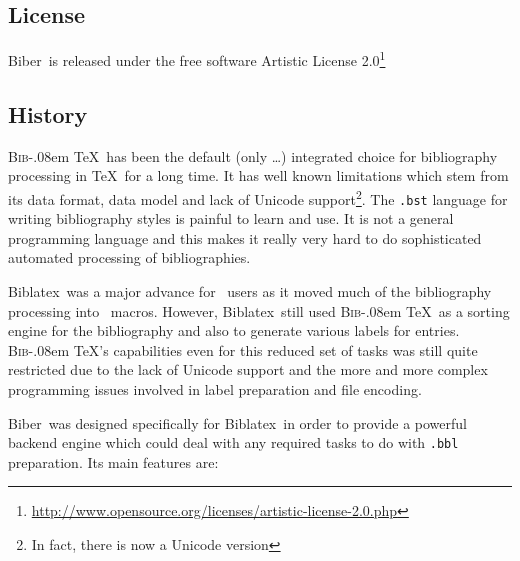\documentclass{ltxdockit}
\def\BibTeX{\textsc{Bib}\kern-.08em \TeX}
\newcommand*{\biber}{Biber\xspace}
\newcommand*{\biblatex}{Biblatex\xspace}
\begin{document}
\subsection{License}

\biber\ is released under the free software Artistic License 2.0\footnote{\url{http://www.opensource.org/licenses/artistic-license-2.0.php}}

\subsection{History}

\BibTeX\ has been the default (only \ldots) integrated choice for
bibliography processing in \TeX\ for a long time. It has well known
limitations which stem from its data format, data model and lack of Unicode
support\footnote{In fact, there is now a Unicode version}. The
\verb+.bst+ language for writing bibliography styles is painful to learn
and use. It is not a general programming language and this makes it really
very hard to do sophisticated automated processing of bibliographies.

\biblatex\ was a major advance for \latex\ users as it moved much
of the bibliography processing into \latex\ macros. However,
\biblatex\ still used \BibTeX\ as a sorting engine for the
bibliography and also to generate various labels for
entries. \BibTeX's capabilities even for this reduced set of
tasks was still quite restricted due to the lack of Unicode support and
the more and more complex programming issues involved in label
preparation and file encoding.

\biber\ was designed specifically for \biblatex\ in order to
provide a powerful backend engine which could deal with any required
tasks to do with \verb+.bbl+ preparation. Its main features are:
\end{document}
